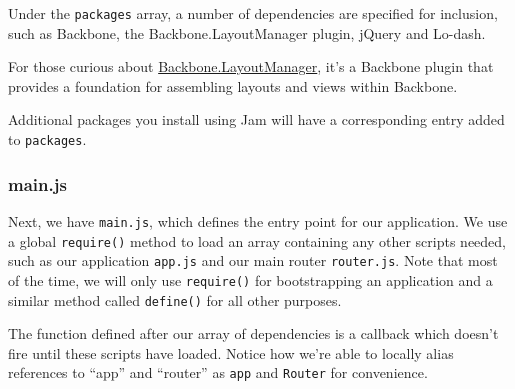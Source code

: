 \documentclass[9pt]{book}
\begin{document}
Under the \texttt{packages} array, a number of dependencies are
specified for inclusion, such as Backbone, the Backbone.LayoutManager
plugin, jQuery and Lo-dash.

For those curious about
\href{https://github.com/tbranyen/backbone.layoutmanager}{Backbone.LayoutManager},
it's a Backbone plugin that provides a foundation for assembling layouts
and views within Backbone.

Additional packages you install using Jam will have a corresponding
entry added to \texttt{packages}.

\subsubsection{main.js}\label{main.js}

Next, we have \texttt{main.js}, which defines the entry point for our
application. We use a global \texttt{require()} method to load an array
containing any other scripts needed, such as our application
\texttt{app.js} and our main router \texttt{router.js}. Note that most
of the time, we will only use \texttt{require()} for bootstrapping an
application and a similar method called \texttt{define()} for all other
purposes.

The function defined after our array of dependencies is a callback which
doesn't fire until these scripts have loaded. Notice how we're able to
locally alias references to ``app'' and ``router'' as \texttt{app} and
\texttt{Router} for convenience.
\end{document}
